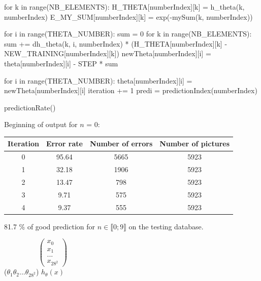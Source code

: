 \documentclass{beamer}
\newcommand{\icol}[1]{
  \left(\begin{smallmatrix}#1\end{smallmatrix}\right)
}
\begin{document}
\begin{casepython}
        for k in range(NB_ELEMENTS):
            H_THETA[numberIndex][k] = h_theta(k, numberIndex)
            E_MY_SUM[numberIndex][k] = exp(-mySum(k, numberIndex))
                
        for i in range(THETA_NUMBER):
            sum = 0
            for k in range(NB_ELEMENTS):
                sum += dh_theta(k, i, numberIndex) * (H_THETA[numberIndex][k] - NEW_TRAINING[numberIndex][k])
            newTheta[numberIndex][i] = theta[numberIndex][i] - STEP * sum
        
        for i in range(THETA_NUMBER):
            theta[numberIndex][i] = newTheta[numberIndex][i]
        iteration += 1
        predi = predictionIndex(numberIndex)

predictionRate()
\end{casepython}

\newpage

\normalsize
Beginning of output for $n$ = 0:\\

\begin{tabular}{ |c|c|c|c| } 
	 \hline
	 Iteration & Error rate & Number of errors & Number of pictures\\ 
	 \hline
	 0 & 95.64 & 5665 & 5923\\
	 \hline
	 1 & 32.18 & 1906 & 5923\\
	 \hline
	 2 & 13.47 & 798 & 5923\\
	 \hline
	 3 & 9.71 & 575 & 5923\\
	 \hline
	 4 & 9.37 & 555 & 5923\\
	 \hline
\end{tabular}

81.7 \% of good prediction for $n \in \llbracket 0; 9 \rrbracket$ on the testing database.

\newpage

$\hspace{2cm}\icol{x_0\\x_1\\...\\x_{28^2}}$\\
\vspace{0.3cm}($\theta_1 \theta_2 ... \theta_{28^2}$) $h_\theta(x)$

\newpage
\end{document}
